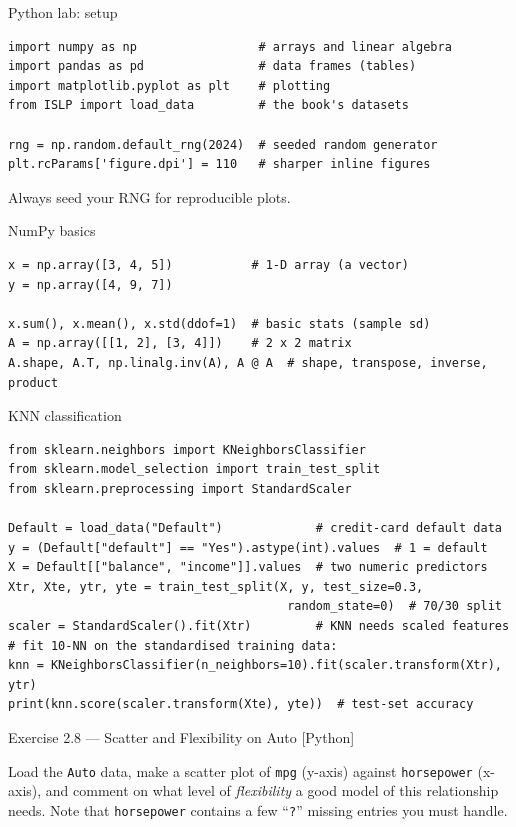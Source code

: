 \documentclass[aspectratio=169,11pt]{beamer}
\begin{document}

\begin{frame}[fragile]{Python lab: setup}
  \begin{lstlisting}
import numpy as np                 # arrays and linear algebra
import pandas as pd                # data frames (tables)
import matplotlib.pyplot as plt    # plotting
from ISLP import load_data         # the book's datasets

rng = np.random.default_rng(2024)  # seeded random generator
plt.rcParams['figure.dpi'] = 110   # sharper inline figures
  \end{lstlisting}
  Always seed your RNG for reproducible plots.
\end{frame}

\begin{frame}[fragile]{NumPy basics}
  \begin{lstlisting}
x = np.array([3, 4, 5])           # 1-D array (a vector)
y = np.array([4, 9, 7])

x.sum(), x.mean(), x.std(ddof=1)  # basic stats (sample sd)
A = np.array([[1, 2], [3, 4]])    # 2 x 2 matrix
A.shape, A.T, np.linalg.inv(A), A @ A  # shape, transpose, inverse, product
  \end{lstlisting}
\end{frame}

\begin{frame}[fragile]{KNN classification}
  \begin{lstlisting}
from sklearn.neighbors import KNeighborsClassifier
from sklearn.model_selection import train_test_split
from sklearn.preprocessing import StandardScaler

Default = load_data("Default")             # credit-card default data
y = (Default["default"] == "Yes").astype(int).values  # 1 = default
X = Default[["balance", "income"]].values  # two numeric predictors
Xtr, Xte, ytr, yte = train_test_split(X, y, test_size=0.3,
                                       random_state=0)  # 70/30 split
scaler = StandardScaler().fit(Xtr)         # KNN needs scaled features
# fit 10-NN on the standardised training data:
knn = KNeighborsClassifier(n_neighbors=10).fit(scaler.transform(Xtr), ytr)
print(knn.score(scaler.transform(Xte), yte))  # test-set accuracy
  \end{lstlisting}
\end{frame}


\begin{frame}{Exercise 2.8 --- Scatter and Flexibility on Auto [Python]}
\begin{exercise}
Load the \texttt{Auto} data, make a scatter plot of \texttt{mpg}
(y-axis) against \texttt{horsepower} (x-axis), and comment on what
level of \emph{flexibility} a good model of this relationship needs.
Note that \texttt{horsepower} contains a few ``\texttt{?}'' missing
entries you must handle.
\end{exercise}
\end{frame}
\end{document}
